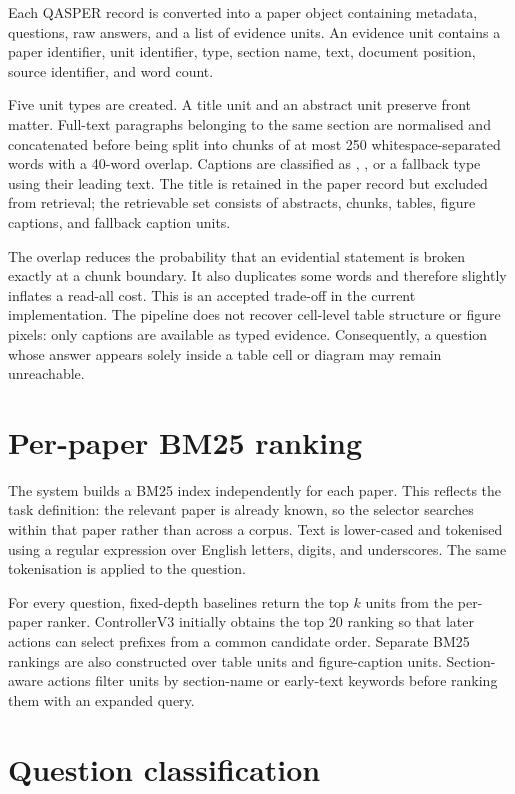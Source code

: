Each QASPER record is converted into a paper object containing metadata, questions, raw answers, and a list of evidence units. An evidence unit contains a paper identifier, unit identifier, type, section name, text, document position, source identifier, and word count.

Five unit types are created. A title unit and an abstract unit preserve front matter. Full-text paragraphs belonging to the same section are normalised and concatenated before being split into chunks of at most 250 whitespace-separated words with a 40-word overlap. Captions are classified as , , or a fallback  type using their leading text. The title is retained in the paper record but excluded from retrieval; the retrievable set consists of abstracts, chunks, tables, figure captions, and fallback caption units.

The overlap reduces the probability that an evidential statement is broken exactly at a chunk boundary. It also duplicates some words and therefore slightly inflates a read-all cost. This is an accepted trade-off in the current implementation. The pipeline does not recover cell-level table structure or figure pixels: only captions are available as typed evidence. Consequently, a question whose answer appears solely inside a table cell or diagram may remain unreachable.

\section{Per-paper BM25 ranking}

The system builds a BM25 index independently for each paper. This reflects the task definition: the relevant paper is already known, so the selector searches within that paper rather than across a corpus. Text is lower-cased and tokenised using a regular expression over English letters, digits, and underscores. The same tokenisation is applied to the question.

For every question, fixed-depth baselines return the top $k$ units from the per-paper ranker. ControllerV3 initially obtains the top 20 ranking so that later actions can select prefixes from a common candidate order. Separate BM25 rankings are also constructed over table units and figure-caption units. Section-aware actions filter units by section-name or early-text keywords before ranking them with an expanded query.

\section{Question classification}

